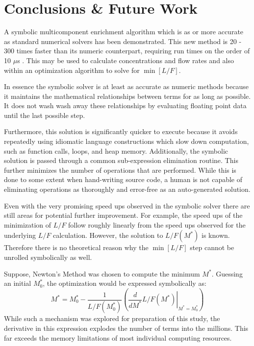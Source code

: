 \documentclass[preprint,12pt]{elsarticle}
\newcommand{\us}[0]{$\mu$s }
\begin{document}
\section{Conclusions \& Future Work}
\label{sec:conc}

A symbolic multicomponent enrichment algorithm which is as or more accurate as 
standard numerical solvers has been demonstrated.  This new method is 20 - 300
times faster than its numeric counterpart, requiring run times on the order of 10 \us.
This may be used to calculate concentrations and flow rates and also within an 
optimization algorithm to solve for $\min\left[L/F\right]$.

In essence the symbolic solver is at least as accurate as numeric methods because
it maintains the mathematical relationships between terms for as long as possible.
It does not wash wash away these relationships by evaluating floating point data
until the last possible step.

Furthermore, this solution is significantly quicker to execute because it avoids
repeatedly using idiomatic language constructions which slow down computation, such
as function calls, loops, and heap memory.  Additionally, the symbolic solution is
passed through a common sub-expression elimination routine.  This further minimizes
the number of operations that are performed.  While this is done to some extent when 
hand-writing source code, a human is not capable of eliminating operations as 
thoroughly and error-free as an auto-generated solution.

Even with the very promising speed ups observed in the symbolic solver there are 
still areas for potential further improvement.  For example, the speed ups of the 
minimization of $L/F$ follow roughly linearly from the speed ups observed for the
underlying $L/F$ calculation.  However, the solution to $L/F(M^*)$ is known.
Therefore there is no theoretical reason why the $\min\left[L/F\right]$ step 
cannot be unrolled symbolically as well.

Suppose, Newton's Method was chosen to compute the minimum $M^*$.  Guessing 
an initial $M_0^*$, the optimization would be expressed symbolically as:
\begin{equation}
M^* = M_0^* - \frac{1}{L/F(M_0^*)}\left(\left.\frac{d}{dM^*}L/F(M^*)\right|_{M^*=M_0^*}\right)
\end{equation}
While such a mechanism was explored for preparation of this study, the derivative
in this expression explodes the number of terms into the millions.  This far exceeds
the memory limitations of most individual computing resources.  
\end{document}
